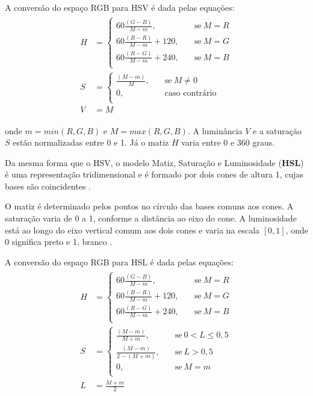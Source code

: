 A conversão do espaço RGB para HSV é dada pelas equações:
\begin{align}
\label{eq:rgb_para_hsv}
\begin{split}
  H &=  \begin{cases}
            60\frac{(G - B)}{M - m}, \quad &\text{se}\ M = R\\
            60\frac{(B - R)}{M - m} + 120, \quad &\text{se}\ M = G\\
            60\frac{(R - G)}{M - m} + 240, \quad &\text{se}\ M = B\\
       \end{cases}
  \\
  S &=  \begin{cases}
            \frac{(M - m)}{M}, \quad &\text{se}\ M \neq 0\\
            0, \quad &\text{caso contrário}\\
       \end{cases}
  \\
  V &= M
\end{split}
\end{align}

\noindent onde $m = min(R, G ,B)$ e $M = max(R, G ,B)$. A luminância $V$ e a saturação $S$ estão normalizadas entre 0 e 1. Já o matiz $H$ varia entre 0 e 360 graus.

Da mesma forma que o HSV, o modelo Matiz, Saturação e Luminosidade (\textbf{HSL}) é uma representação tridimensional e é formado por dois cones de altura 1, cujas bases são coincidentes \citep{pedrini:08}.

O matiz é determinado pelos pontos no círculo das bases comuns aos cones. A saturação varia de 0 a 1, conforme a distância ao eixo do cone. A luminosidade está ao longo do eixo vertical comum aos dois cones e varia na escala $[0, 1]$, onde 0 significa preto e 1, branco \citep{pedrini:08}.

A conversão do espaço RGB para HSL é dada pelas equações:
\begin{align}
\label{eq:rgb_para_hsl}
\begin{split}
  H &=  \begin{cases}
            60\frac{(G - B)}{M - m}, \quad &\text{se}\ M = R\\
            60\frac{(B - R)}{M - m} + 120, \quad &\text{se}\ M = G\\
            60\frac{(R - G)}{M - m} + 240, \quad &\text{se}\ M = B\\
       \end{cases}
  \\
  S &=  \begin{cases}
            \frac{(M - m)}{M + m}, \quad &\text{se}\ 0 < L \leq 0,5\\
            \frac{(M - m)}{2 - (M + m)}, \quad &\text{se}\ L > 0,5\\
            0, \quad &\text{se}\ M = m\\
       \end{cases}
  \\
  L &= \frac{M + m}{2}
\end{split}
\end{align}

